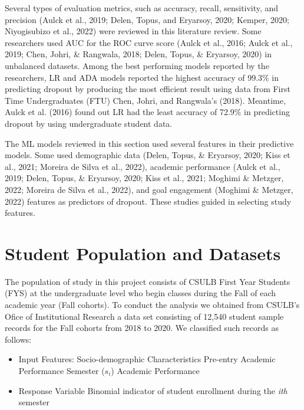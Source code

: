 \documentclass[notitlepage,12pt]{jedm}
\begin{document}
\par Several types of evaluation metrics, such as accuracy, recall, sensitivity, and precision (Aulck et al., 2019; Delen, Topus, and Eryarsoy, 2020; Kemper, 2020; Niyogisubizo et al., 2022) were reviewed in this literature review.  Some researchers used AUC for the ROC curve score (Aulck et al., 2016; Aulck et al., 2019; Chen, Johri, \& Rangwala, 2018; Delen, Topus, \& Eryarsoy, 2020) in unbalanced datasets.  Among the best performing models reported by the researchers, LR and ADA models reported the highest accuracy of 99.3\% in predicting dropout by producing the most efficient result using data from First Time Undergraduates (FTU) Chen, Johri, and Rangwala’s (2018).  Meantime, Aulck et al. (2016) found out LR had the least accuracy of 72.9\% in predicting dropout by using undergraduate student data.   

\par The ML models reviewed in this section used several features in their predictive models.  Some used demographic data (Delen, Topus, \& Eryarsoy, 2020; Kiss et al., 2021; Moreira de Silva et al., 2022), academic performance (Aulck et al., 2019; Delen, Topus, \& Eryarsoy, 2020; Kiss et al., 2021; Moghimi \& Metzger, 2022; Moreira de Silva et al., 2022), and goal engagement (Moghimi \& Metzger, 2022) features as predictors of dropout.  These studies guided in selecting study features. 

\section{Student Population and Datasets}

\par The population of study in this project consists of CSULB First Year Students (FYS) at the undergraduate level who begin classes during the Fall of each academic year (Fall cohorts). To conduct the analysis we obtained from CSULB's Ofice of Institutional Research a data set consisting of 12,540 student sample records for the Fall cohorts from 2018 to 2020. We classified such records as follows:

\begin{itemize}
\item Input Features:
\subitem{-} Socio-demographic Characteristics
\subitem{-} Pre-entry Academic Performance
\subitem{-} Semester ($s_i$) Academic Performance
\item Response Variable
\subitem{-} Binomial indicator of student enrollment during the \emph{ith} semester
\end{itemize}
\end{document}

